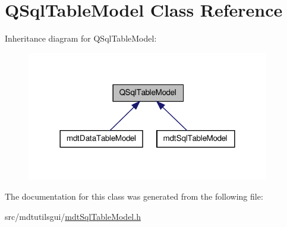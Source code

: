 \hypertarget{class_q_sql_table_model}{\section{Q\-Sql\-Table\-Model Class Reference}
\label{class_q_sql_table_model}
}


Inheritance diagram for Q\-Sql\-Table\-Model\-:\nopagebreak
\begin{figure}[H]
\begin{center}
\leavevmode
\includegraphics[width=300pt]{class_q_sql_table_model__inherit__graph}
\end{center}
\end{figure}


The documentation for this class was generated from the following file\-:\begin{DoxyCompactItemize}
\item 
src/mdtutilsgui/\hyperlink{mdt_sql_table_model_8h}{mdt\-Sql\-Table\-Model.\-h}\end{DoxyCompactItemize}
